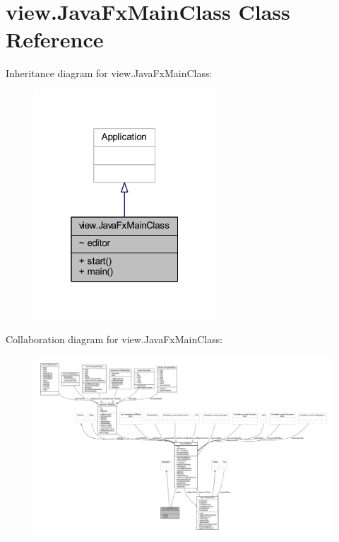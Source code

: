 \hypertarget{classview_1_1_java_fx_main_class}{}\section{view.\+Java\+Fx\+Main\+Class Class Reference}
\label{classview_1_1_java_fx_main_class}


Inheritance diagram for view.\+Java\+Fx\+Main\+Class\+:\nopagebreak
\begin{figure}[H]
\begin{center}
\leavevmode
\includegraphics[width=193pt]{classview_1_1_java_fx_main_class__inherit__graph}
\end{center}
\end{figure}


Collaboration diagram for view.\+Java\+Fx\+Main\+Class\+:\nopagebreak
\begin{figure}[H]
\begin{center}
\leavevmode
\includegraphics[width=350pt]{classview_1_1_java_fx_main_class__coll__graph}
\end{center}
\end{figure}
